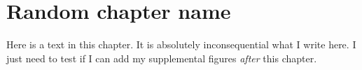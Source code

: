 \documentclass[paper=a4,parskip=half,headings=normal]{scrreprt}
\begin{document}
\chapter{Random chapter name}

Here is a text in this chapter. It is absolutely inconsequential what I write here. I just need to test if I can add my supplemental figures \textit{after} this chapter.


\end{document}

